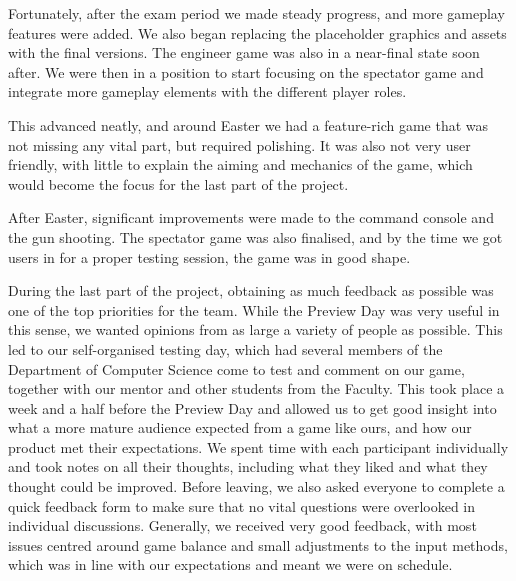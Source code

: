 \documentclass[a4paper,11pt]{article}
\begin{document}
Fortunately, after the exam period we made steady progress, and more gameplay features were added. We also began replacing the placeholder graphics and assets with the final versions. The engineer game was also in a near-final state soon after. We were then in a position to start focusing on the spectator game and integrate more gameplay elements with the different player roles.

This advanced neatly, and around Easter we had a feature-rich game that was not missing any vital part, but required polishing. It was also not very user friendly, with little to explain the aiming and mechanics of the game, which would become the focus for the last part of the project.

After Easter, significant improvements were made to the command console and the gun shooting. The spectator game was also finalised, and by the time we got users in for a proper testing session, the game was in good shape.

During the last part of the project, obtaining as much feedback as possible was one of the top priorities for the team. While the Preview Day was very useful in this sense, we wanted opinions from as large a variety of people as possible. This led to our self-organised testing day, which had several members of the Department of Computer Science come to test and comment on our game, together with our mentor and other students from the Faculty. This took place a week and a half before the Preview Day and allowed us to get good insight into what a more mature audience expected from a game like ours, and how our product met their expectations. We spent time with each participant individually and took notes on all their thoughts, including what they liked and what they thought could be improved. Before leaving, we also asked everyone to complete a quick feedback form to make sure that no vital questions were overlooked in individual discussions. Generally, we received very good feedback, with most issues centred around game balance and small adjustments to the input methods, which was in line with our expectations and meant we were on schedule.
\end{document}
